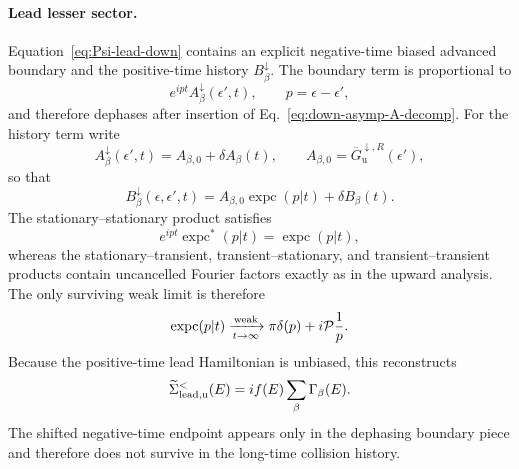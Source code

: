 \documentclass[
 reprint,
 superscriptaddress,
 amsmath,amssymb,
 aps,prb,
 longbibliography,
 floatfix
]{revtex4-2}
\newcommand{\expc}{\operatorname{expc}}
\begin{document}
\paragraph{Lead lesser sector.}
Equation~\eqref{eq:Psi-lead-down} contains an explicit negative-time biased advanced boundary and the positive-time history \(B_\beta^\downarrow\). The boundary term is proportional to
\begin{equation*}
e^{ip t}A_\beta^\downarrow(\epsilon',t),
\qquad
p=\epsilon-\epsilon',
\end{equation*}
and therefore dephases after insertion of Eq.~\eqref{eq:down-asymp-A-decomp}. For the history term write
\begin{equation*}
A_\beta^\downarrow(\epsilon',t)
=A_{\beta,0}+\delta A_\beta(t),
\qquad
A_{\beta,0}=\overline G_{\mathrm u}^{\downarrow,R}(\epsilon'),
\end{equation*}
so that
\begin{equation}
B_\beta^\downarrow(\epsilon,\epsilon',t)
=
A_{\beta,0}\expc(p|t)
+
\delta B_\beta(t).
\label{eq:down-asymp-B-decomp}
\end{equation}
The stationary--stationary product satisfies
\begin{equation*}
e^{ipt}\expc^*(p|t)=\expc(p|t),
\end{equation*}
whereas the stationary--transient, transient--stationary, and transient--transient products contain uncancelled Fourier factors exactly as in the upward analysis. The only surviving weak limit is therefore
\begin{equation*}
\expc(p|t)
\xrightarrow[t\to\infty]{\rm weak}
\pi\delta(p)+i\mathcal P\frac1p.
\end{equation*}
Because the positive-time lead Hamiltonian is unbiased, this reconstructs
\begin{equation}
\widetilde\Sigma_{\rm lead,u}^{<}(E)
=
i f(E)\sum_\beta\Gamma_\beta(E).
\label{eq:down-asymp-lead-lesser}
\end{equation}
The shifted negative-time endpoint appears only in the dephasing boundary piece and therefore does not survive in the long-time collision history.
\end{document}
